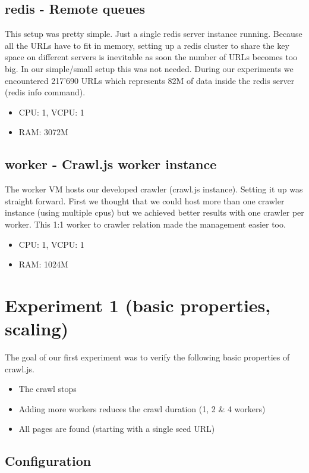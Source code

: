 \subsection{redis - Remote queues}
This setup was pretty simple. Just a single redis server instance running. Because all the URLs have to fit in memory, setting up a redis cluster to share the key space on different servers is inevitable as soon the number of URLs becomes too big. In our simple/small setup this was not needed. During our experiments we encountered 217'690 URLs which represents 82M of data inside the redis server (redis info command).

\begin{itemize}
  \item CPU: 1, VCPU: 1
  \item RAM: 3072M
\end{itemize}

\subsection{worker - Crawl.js worker instance}
The worker VM hosts our developed crawler (crawl.js instance). Setting it up was straight forward. First we thought that we could host more than one crawler instance (using multiple cpus) but we achieved better results with one crawler per worker. This 1:1 worker to crawler relation made the management easier too.

\begin{itemize}
  \item CPU: 1, VCPU: 1
  \item RAM: 1024M
\end{itemize}

\section{Experiment 1 (basic properties, scaling)}

The goal of our first experiment was to verify the following basic properties of crawl.js.

\begin{itemize}
  \item The crawl stops
  \item Adding more workers reduces the crawl duration (1, 2 \& 4 workers)
  \item All pages are found (starting with a single seed URL)
\end{itemize}

\subsection{Configuration}

